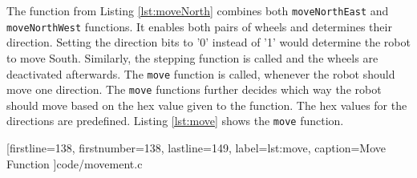 The function from Listing \ref{lst:moveNorth} combines both
{\tt moveNorthEast} and {\tt moveNorthWest} functions.
It enables both pairs of wheels and determines their
direction. Setting the direction bits to '0' instead of
'1' would determine the robot to move South. Similarly, 
the stepping function is called and the wheels are 
deactivated afterwards.
\clearpage
The {\tt move} function is called, whenever the robot should
move one direction. The {\tt move} functions further decides
which way the robot should move based on the hex value given 
to the function. The hex values for the directions are predefined.
Listing \ref{lst:move} shows the {\tt move} function.
 

[firstline=138,
firstnumber=138,
lastline=149,		
label=lst:move,
caption={Move Function}
]{code/movement.c}